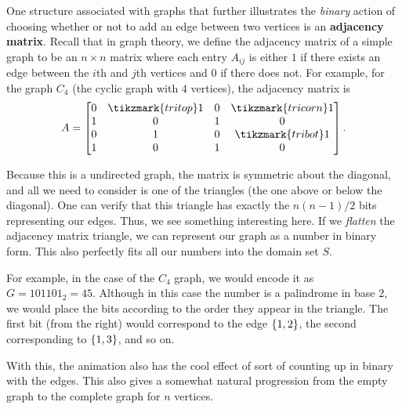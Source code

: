 One structure associated with graphs that further illustrates the
\textit{binary} action of choosing whether or not to add an edge between two
vertices is an \textbf{adjacency matrix}. Recall that in graph theory, we
define the adjacency matrix of a simple graph to be an \( n \times n \) matrix
where each entry \( A_{ij} \) is either \( 1 \) if there exists an edge between
the \( i \)th and \( j \)th vertices and \( 0 \) if there does not. For example, for the graph \( C_4 \) (the cyclic graph with \( 4 \) vertices), the adjacency matrix is
\[
    A = \begin{bmatrix}
        0 & \tikzmark{tritop} 1 & 0 & \tikzmark{tricorn} 1 \\
        1 & 0 & 1 & 0 \\
        0 & 1 & 0 & \tikzmark{tribot} 1 \\
        1 & 0 & 1 & 0 \\
    \end{bmatrix}
.\]
Because this is a undirected graph, the matrix is symmetric about the diagonal,
and all we need to consider is one of the triangles (the one above or below the
diagonal). One can verify that this triangle has exactly the \( n \left( n - 1
\right) / 2 \)  bits representing our edges.
Thus, we see something interesting here. If we \textit{flatten} the adjacency
matrix triangle, we can represent our graph as a number in binary form. This
also perfectly fits all our numbers into the domain set \( S \).

For example, in the case of the \( C_4 \) graph, we would encode it as \( G =
101101_2 = 45 \). Although in this case the number is a palindrome in base \( 2
\), we would place the bits according to the order they appear in the triangle.
The first bit (from the right) would correspond to the edge \( \left\{ 1, 2 \right\} \),
the second corresponding to \( \left\{ 1, 3 \right\} \), and so on.

With this, the animation also has the cool effect of sort of counting up in
binary with the edges. This also gives a somewhat natural progression from the empty graph to the complete graph for \( n \) vertices.

